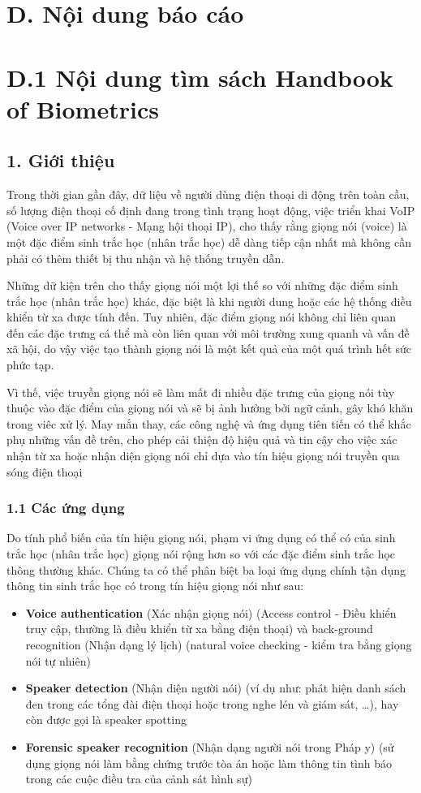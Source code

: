 \documentclass{article}
\begin{document}
	\section{D. Nội dung báo cáo}
	\section{D.1 Nội dung tìm sách Handbook of Biometrics}
	\subsection{1. Giới thiệu}
	\qquad\qquad Trong thời gian gần đây, dữ liệu về người dùng điện thoại di động trên toàn cầu, số lượng điện thoại cố định đang trong tình trạng hoạt động, việc triển khai VoIP (Voice over IP networks - Mạng hội thoại IP), cho thấy rằng giọng nói (voice) là một đặc điểm sinh trắc học (nhân trắc học) dễ dàng tiếp cận nhất mà không cần phải có thêm thiết bị thu nhận và hệ thống truyền dẫn.
	
	Những dữ kiện trên cho thấy giọng nói một lợi thế so với những đặc điểm sinh trắc học (nhân trắc học) khác, đặc biệt là khi người dung hoặc các hệ thống điều khiển từ xa được tính đến. Tuy nhiên, đặc điểm giọng nói không chỉ liên quan đến các đặc trưng cá thể mà còn liên quan với môi trường xung quanh và vấn đề xã hội, do vậy việc tạo thành giọng nói là một kết quả của một quá trình hết sức phức tạp.
	
	Vì thế, việc truyền giọng nói sẽ làm mất đi nhiều đặc trưng của giọng nói tùy thuộc vào đặc điểm của giọng nói và sẽ bị ảnh hưởng bởi ngữ cảnh, gây khó khăn trong viêc xử lý. May mắn thay, các công nghệ và ứng dụng tiên tiến có thể khắc phụ những vấn đề trên, cho phép cải thiện độ hiệu quả và tin cậy cho việc xác nhận từ xa hoặc nhận diện giọng nói chỉ dựa vào tín hiệu giọng nói truyền qua sóng điện thoại
	\subsubsection{1.1 Các ứng dụng}
	\qquad Do tính phổ biến của tín hiệu giọng nói, phạm vi ứng dụng có thể có của sinh trắc học (nhân trắc học) giọng nói rộng hơn so với các đặc điểm sinh trắc học thông thường khác. Chúng ta có thể phân biệt ba loại ứng dụng chính tận dụng thông tin sinh trắc học có trong tín hiệu giọng nói như sau:
	
	\begin{itemize}
		\item \textbf{Voice authentication} (Xác nhận giọng nói) (Access control - Điều khiển truy cập, thường là điều khiển từ xa bằng điện thoại) và back-ground recognition (Nhận dạng lý lịch) (natural voice checking - kiểm tra bằng giọng nói tự nhiên)
		\item \textbf{Speaker detection} (Nhận diện người nói) (ví dụ như: phát hiện danh sách đen trong các tổng đài điện thoại hoặc trong nghe lén và giám sát, …), hay còn được gọi là speaker spotting
		\item \textbf{Forensic speaker recognition} (Nhận dạng người nói trong Pháp y) (sử dụng giọng nói làm bằng chứng trước tòa án hoặc làm thông tin tình báo trong các cuộc điều tra của cảnh sát hình sự)
	\end{itemize}
\end{document}
